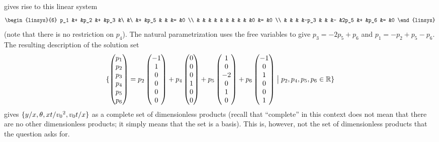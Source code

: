 \begin{exercises}
\begin{answer}
\begin{exparts}
\begin{equation*}
          \end{equation*}
          gives rise to this linear system
          \begin{equation*}
            \begin{linsys}{6}
              p_1  &+  &p_2  &+  &p_3  &\   &\   &+  &p_5  &   &    &=  &0  \\
                   &   &     &   &     &    &    &   &     &   &0   &=  &0  \\
                   &   &     &   &-p_3 &    &    &-  &2p_5 &+  &p_6 &=  &0  
            \end{linsys}
          \end{equation*}
          (note that there is no restriction on $p_4$).
          The natural parametrization uses the free variables to give
          $p_3=-2p_5+p_6$ and $p_1=-p_2+p_5-p_6$.
          The resulting description of the solution set
          \begin{equation*}
            \mbox{$\{\begin{pmatrix} p_1 \\ p_2 \\ p_3 \\ p_4 \\ p_5 \\ p_6 \end{pmatrix}
                =p_2\begin{pmatrix} -1 \\ 1 \\ 0 \\ 0  \\ 0 \\ 0 \end{pmatrix} 
                +p_4\begin{pmatrix} 0 \\ 0 \\ 0 \\ 1 \\ 0 \\ 0 \end{pmatrix} 
                +p_5\begin{pmatrix} 1 \\ 0 \\ -2 \\ 0 \\ 1 \\ 0 \end{pmatrix} 
                +p_6\begin{pmatrix} -1 \\ 0 \\ 1 \\ 0 \\ 0 \\ 1 \end{pmatrix} 
                \bigm| p_2, p_4, p_5, p_6\in\mathbb{R}  \}$}
          \end{equation*}
          gives $\mbox{$\{y/x,\theta,xt/{v_0}^2,v_0t/x\}$}$ 
          as a complete set of dimensionless products
          (recall that ``complete'' in this context does not mean 
          that there are no other dimensionless products;
          it simply means that the set is a basis).
          This is, however, not the set of dimensionless products that
          the question asks for.


\end{exparts}
\end{answer}
\end{exercises}
